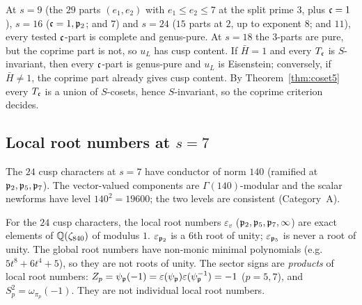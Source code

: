 \begin{proposition}\label{prop:deep}
At $s=9$ (the $29$ parts $(e_1,e_2)$ with $e_1\le e_2\le7$ at the split prime $3$, plus $\mathfrak{c}=1$), $s=16$ ($\mathfrak{c}=1,\mathfrak{p}_2$; and $7$) and $s=24$ ($15$ parts at $2$, up to
exponent $8$; and $11$), every tested $\mathfrak{c}$-part is complete and genus-pure. At $s=18$ the $3$-parts are pure, but the coprime part is not, so $u_L$ has cusp content.
If $\bar H=1$ and every $T_{\mathfrak{c}}$ is $S$-invariant, then every $\mathfrak{c}$-part is genus-pure and $u_L$ is Eisenstein; conversely, if $\bar H\neq1$, the coprime part already
gives cusp content. By Theorem~\ref{thm:coset5} every $T_{\mathfrak{c}}$ is a union of $S$-cosets, hence $S$-invariant, so the coprime criterion decides.
\end{proposition}

\subsection{Local root numbers at $s=7$}\label{sec:al}
The $24$ cusp characters at $s=7$ have conductor of norm $140$ (ramified at $\mathfrak{p}_2,\mathfrak{p}_5,\mathfrak{p}_7$). The vector-valued components are $\Gamma(140)$-modular and
the scalar newforms have level $140^2=19600$; the two levels are consistent (Category~A).
\begin{proposition}\label{prop:al6}
For the $24$ cusp characters, the local root numbers $\varepsilon_v$ ($\mathfrak{p}_2,\mathfrak{p}_5,\mathfrak{p}_7,\infty$) are exact elements of $\mathbb{Q}(\zeta_{840})$ of modulus $1$. $\varepsilon_{\mathfrak{p}_2}$ is a $6$th root of unity; $\varepsilon_{\mathfrak{p}_5}$ is never a root of unity. The global root numbers have non-monic minimal polynomials (e.g.\ $5t^8+6t^4+5$), so they are not roots of unity. The sector signs are \emph{products} of local root numbers: $Z_p=\psi_{\mathfrak{p}}(-1)=\varepsilon(\psi_{\mathfrak{p}})\varepsilon(\psi_{\mathfrak{p}}^{-1})=-1$ ($p=5,7$), and $S_p^2=\omega_{\pi_p}(-1)$. They are not individual local root numbers.
\end{proposition}
